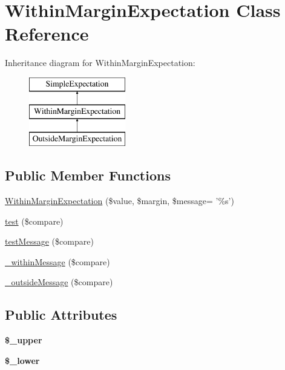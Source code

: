 \hypertarget{class_within_margin_expectation}{
\section{WithinMarginExpectation Class Reference}
\label{class_within_margin_expectation}
}
Inheritance diagram for WithinMarginExpectation:\begin{figure}[H]
\begin{center}
\leavevmode
\includegraphics[height=3.000000cm]{class_within_margin_expectation}
\end{center}
\end{figure}
\subsection*{Public Member Functions}
\begin{DoxyCompactItemize}
\item 
\hyperlink{class_within_margin_expectation_a6bd172519fd6aaa9eba71f96d1f48621}{WithinMarginExpectation} (\$value, \$margin, \$message= '\%s')
\item 
\hyperlink{class_within_margin_expectation_a3c8697495cb187b62bc6cf020e2e2ded}{test} (\$compare)
\item 
\hyperlink{class_within_margin_expectation_a4b2f6fda3d30a50c3b3ce003520262c8}{testMessage} (\$compare)
\item 
\hyperlink{class_within_margin_expectation_a1dc05788944d32ed735f353745f1270f}{\_\-withinMessage} (\$compare)
\item 
\hyperlink{class_within_margin_expectation_a39d1443aebe1ba7e22c14ec580a6dc1b}{\_\-outsideMessage} (\$compare)
\end{DoxyCompactItemize}
\subsection*{Public Attributes}
\begin{DoxyCompactItemize}
\item 
\hypertarget{class_within_margin_expectation_a84856f447bb18e4b0694684e3dfcbb31}{
{\bfseries \$\_\-upper}}
\label{class_within_margin_expectation_a84856f447bb18e4b0694684e3dfcbb31}

\item 
\hypertarget{class_within_margin_expectation_a8efd149036edaf545d6e8c4744dd1b34}{
{\bfseries \$\_\-lower}}
\label{class_within_margin_expectation_a8efd149036edaf545d6e8c4744dd1b34}

\end{DoxyCompactItemize}


